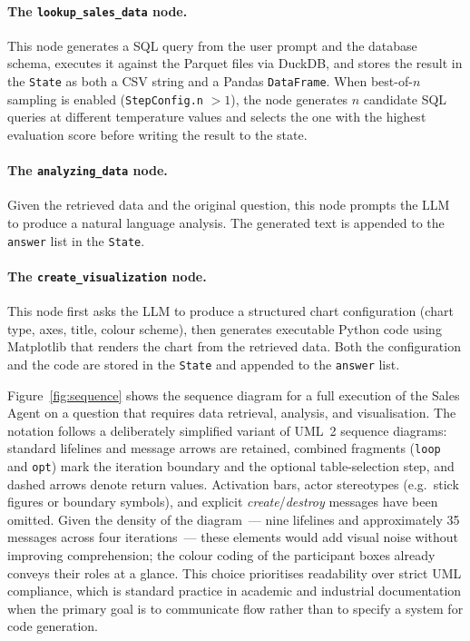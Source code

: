 \documentclass[11pt,a4paper]{article}
\begin{document}
\paragraph{The \texttt{lookup\_sales\_data} node.}
This node generates a SQL query from the user prompt and the database schema, executes
it against the Parquet files via DuckDB, and stores the result in the \texttt{State}
as both a CSV string and a Pandas \texttt{DataFrame}.
When best-of-$n$ sampling is enabled (\texttt{StepConfig.n} $> 1$), the node generates
$n$ candidate SQL queries at different temperature values and selects the one with the
highest evaluation score before writing the result to the state.

\paragraph{The \texttt{analyzing\_data} node.}
Given the retrieved data and the original question, this node prompts the LLM to produce
a natural language analysis. The generated text is appended to the \texttt{answer} list
in the \texttt{State}.

\paragraph{The \texttt{create\_visualization} node.}
This node first asks the LLM to produce a structured chart configuration (chart type,
axes, title, colour scheme), then generates executable Python code using Matplotlib
that renders the chart from the retrieved data. Both the configuration and the code
are stored in the \texttt{State} and appended to the \texttt{answer} list.

\vspace{0.5em}
Figure~\ref{fig:sequence} shows the sequence diagram for a full execution of the
Sales Agent on a question that requires data retrieval, analysis, and visualisation.
The notation follows a deliberately simplified variant of UML~2 sequence diagrams:
standard lifelines and message arrows are retained, combined fragments (\texttt{loop}
and \texttt{opt}) mark the iteration boundary and the optional table-selection step,
and dashed arrows denote return values. Activation bars, actor stereotypes (e.g.\
stick figures or boundary symbols), and explicit \emph{create}/\emph{destroy} messages
have been omitted. Given the density of the diagram~--- nine lifelines and approximately
35 messages across four iterations~--- these elements would add visual noise without
improving comprehension; the colour coding of the participant boxes already conveys
their roles at a glance. This choice prioritises readability over strict UML compliance,
which is standard practice in academic and industrial documentation when the primary
goal is to communicate flow rather than to specify a system for code generation.
\end{document}
